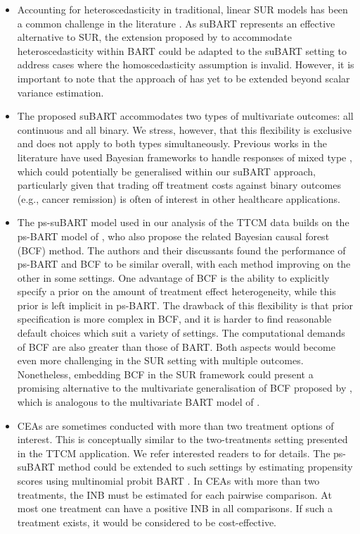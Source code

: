 \documentclass[aoas,preprint]{imsart}
\theoremstyle{plain}
\theoremstyle{definition}
\theoremstyle{remark}
\begin{document}
\begin{itemize}[wide]
    \item Accounting for heteroscedasticity in traditional, linear SUR models has been a common challenge in the literature \citep{afolayan2018efficiency}. As suBART represents an effective alternative to SUR, the extension proposed by \citet{pratola2020heteroscedastic} to accommodate heteroscedasticity within BART could be adapted to the suBART setting to address cases where the homoscedasticity assumption is invalid. However, it is important to note that the approach of \citet{pratola2020heteroscedastic} has yet to be extended beyond scalar variance estimation.
    \item The proposed suBART accommodates two types of multivariate outcomes: all continuous and all binary. We stress, however, that this flexibility is exclusive and does not apply to both types simultaneously. Previous works in the literature have used Bayesian frameworks to handle responses of mixed type \citep[e.g.][]{flexible2014papa, zhang2015bayesprobit, bayesianmix20216tony}, which could potentially be generalised within our suBART approach, particularly given that trading off treatment costs against binary outcomes (e.g., cancer remission) is often of interest in other healthcare applications.
    \item The ps-suBART model used in our analysis of the TTCM data builds on the ps-BART model of \citet{hahn2020bayesian}, who also propose the related Bayesian causal forest (BCF) method. The authors and their discussants found the performance of ps-BART and BCF to be similar overall, with each method improving on the other in some settings. One advantage of BCF is the ability to explicitly specify a prior on the amount of treatment effect heterogeneity, while this prior is left implicit in ps-BART. The drawback of this flexibility is that prior specification is more complex in BCF, and it is harder to find reasonable default choices which suit a variety of settings. The computational demands of BCF are also greater than those of BART. Both aspects would become even more challenging in the SUR setting with multiple outcomes. Nonetheless, embedding BCF in the SUR framework could present a promising alternative to the multivariate generalisation of BCF proposed by \citet{mcjames2024bayesian}, which is analogous to the multivariate BART model of \citet{um2023bayesian}.
    \item CEAs are sometimes conducted with more than two treatment options of interest. This is conceptually similar to the two-treatments setting presented in the TTCM application. We refer interested readers to \citet[Section~4.4]{drummond2015methods} for details. The ps-suBART method could be extended to such settings by estimating propensity scores using multinomial probit BART \citep{kindo2016multinomial}. In CEAs with more than two treatments, the INB must be estimated for each pairwise comparison. At most one treatment can have a positive INB in all comparisons. If such a treatment exists, it would be considered to be cost-effective.

\end{itemize}
\end{document}
